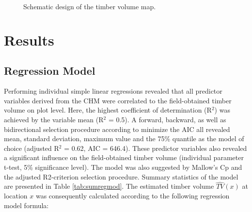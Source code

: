 \begin{figure}[H]
	\centering
	\caption{Schematic design of the timber volume map.}
	\label{fig:mapdesign}
\end{figure}



\section{Results}
\label{sec:Res}

\subsection{Regression Model}
\label{sec:resmod}

Performing individual simple linear regressions revealed that all predictor variables derived from the CHM were correlated to the field-obtained timber volume on plot level. Here, the highest coefficient of determination (R$^2$) was achieved by the variable mean (R$^2$ = 0.5). A forward, backward, as well as bidirectional selection procedure according to minimize the AIC all revealed mean, standard deviation, maximum value and the 75\% quantile as the model of choice (adjusted R$^2$ = 0.62, AIC = 646.4). These predictor variables also revealed a significant influence on the field-obtained timber volume (individual parameter t-test, 5\% significance level). The model was also suggested by Mallow's Cp and the adjusted R2-criterion selection procedure. Summary statistics of the model are presented in Table \ref{tab:sumregmod}. The estimated timber volume $\hat{TV}(x)$ at location $x$ was consequently calculated according to the following regression model formula:

